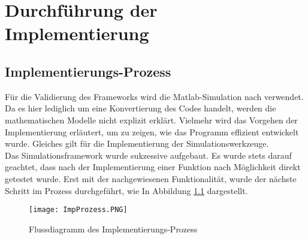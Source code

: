 \chapter{Durchführung der Implementierung}
\section{Implementierungs-Prozess}
Für die Validierung des Frameworks wird die Matlab-Simulation nach \cite{Olucak.15.02.2017} verwendet. Da es hier lediglich um eine Konvertierung des Codes handelt, werden die mathematischen Modelle nicht explizit erklärt. Vielmehr wird das Vorgehen der Implementierung erläutert, um zu zeigen, wie das Programm effizient entwickelt wurde. Gleiches gilt für die Implementierung der Simulationswerkzeuge.\\
 Das Simulationsframework wurde sukzessive aufgebaut. Es wurde stets darauf geachtet, dass nach der Implementierung einer Funktion nach Möglichkeit direkt getestet wurde. Erst mit der nachgewiesenen Funktionalität, wurde der nächste Schritt im Prozess durchgeführt, wie In Abbildung \ref{fig: ImpProzess} dargestellt.
\begin{figure}[h]
	\texttt{[image: ImpProzess.PNG]}
	\caption{Flussdiagramm des Implementierungs-Prozess}
	\label{fig: ImpProzess}
\end{figure}
